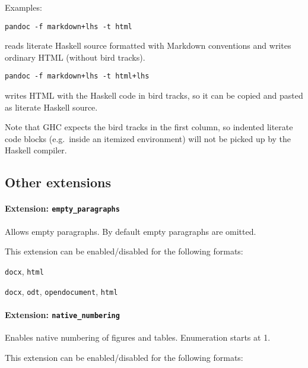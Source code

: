 \documentclass[
]{article}
\providecommand{\tightlist}{%
  \setlength{\itemsep}{0pt}\setlength{\parskip}{0pt}}
\begin{document}
Examples:

\begin{verbatim}
pandoc -f markdown+lhs -t html
\end{verbatim}

reads literate Haskell source formatted with Markdown conventions and
writes ordinary HTML (without bird tracks).

\begin{verbatim}
pandoc -f markdown+lhs -t html+lhs
\end{verbatim}

writes HTML with the Haskell code in bird tracks, so it can be copied
and pasted as literate Haskell source.

Note that GHC expects the bird tracks in the first column, so indented
literate code blocks (e.g.~inside an itemized environment) will not be
picked up by the Haskell compiler.

\subsection{Other extensions}\label{other-extensions}

\paragraph{\texorpdfstring{Extension:
\texttt{empty\_paragraphs}}{Extension: empty\_paragraphs}}\label{extension-empty_paragraphs}

Allows empty paragraphs. By default empty paragraphs are omitted.

This extension can be enabled/disabled for the following formats:

\begin{description}
\tightlist
\item[input formats]
\texttt{docx}, \texttt{html}
\item[output formats]
\texttt{docx}, \texttt{odt}, \texttt{opendocument}, \texttt{html}
\end{description}

\paragraph{\texorpdfstring{Extension:
\texttt{native\_numbering}}{Extension: native\_numbering}}\label{extension-native_numbering}

Enables native numbering of figures and tables. Enumeration starts at 1.

This extension can be enabled/disabled for the following formats:
\end{document}
